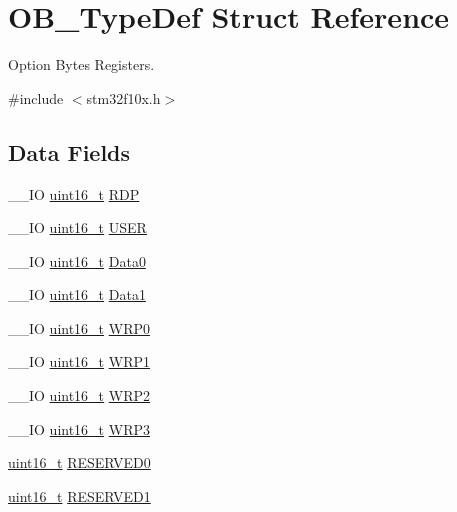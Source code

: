 \hypertarget{struct_o_b___type_def}{\section{O\-B\-\_\-\-Type\-Def Struct Reference}
\label{struct_o_b___type_def}
}


Option Bytes Registers.  




{\ttfamily \#include $<$stm32f10x.\-h$>$}

\subsection*{Data Fields}
\begin{DoxyCompactItemize}
\item 
\-\_\-\-\_\-\-I\-O \hyperlink{stdint_8h_a273cf69d639a59973b6019625df33e30}{uint16\-\_\-t} \hyperlink{struct_o_b___type_def_ad9f9ae594003c39cc27f147e29a130bb}{R\-D\-P}
\item 
\-\_\-\-\_\-\-I\-O \hyperlink{stdint_8h_a273cf69d639a59973b6019625df33e30}{uint16\-\_\-t} \hyperlink{struct_o_b___type_def_ab0292062a80446c97dac24604bd8ed8e}{U\-S\-E\-R}
\item 
\-\_\-\-\_\-\-I\-O \hyperlink{stdint_8h_a273cf69d639a59973b6019625df33e30}{uint16\-\_\-t} \hyperlink{struct_o_b___type_def_a7570c0ba4b4d31c6061d595279e6b36e}{Data0}
\item 
\-\_\-\-\_\-\-I\-O \hyperlink{stdint_8h_a273cf69d639a59973b6019625df33e30}{uint16\-\_\-t} \hyperlink{struct_o_b___type_def_a4e0e4a89db7004fb08a8a19129e9970e}{Data1}
\item 
\-\_\-\-\_\-\-I\-O \hyperlink{stdint_8h_a273cf69d639a59973b6019625df33e30}{uint16\-\_\-t} \hyperlink{struct_o_b___type_def_acee93898f092604a871e52d64560e7a9}{W\-R\-P0}
\item 
\-\_\-\-\_\-\-I\-O \hyperlink{stdint_8h_a273cf69d639a59973b6019625df33e30}{uint16\-\_\-t} \hyperlink{struct_o_b___type_def_ad397993d8c149a64e3f2a8bc7ecdf1c5}{W\-R\-P1}
\item 
\-\_\-\-\_\-\-I\-O \hyperlink{stdint_8h_a273cf69d639a59973b6019625df33e30}{uint16\-\_\-t} \hyperlink{struct_o_b___type_def_a475b2347222db8e35d7ade1a881ca31c}{W\-R\-P2}
\item 
\-\_\-\-\_\-\-I\-O \hyperlink{stdint_8h_a273cf69d639a59973b6019625df33e30}{uint16\-\_\-t} \hyperlink{struct_o_b___type_def_ab8bdaebc42e051ff9911eb88dad75f92}{W\-R\-P3}
\item 
\hyperlink{stdint_8h_a273cf69d639a59973b6019625df33e30}{uint16\-\_\-t} \hyperlink{struct_o_b___type_def_a47e5d3b9fc64cb13b76935ce60798bf5}{R\-E\-S\-E\-R\-V\-E\-D0}
\item 
\hyperlink{stdint_8h_a273cf69d639a59973b6019625df33e30}{uint16\-\_\-t} \hyperlink{struct_o_b___type_def_ac9f74fcb5eb1a543bc4ec85434bccb2f}{R\-E\-S\-E\-R\-V\-E\-D1}
\end{DoxyCompactItemize}


